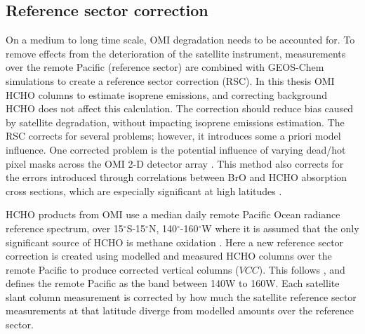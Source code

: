    
  \subsection{Reference sector correction}
    \label{Model:omiRecalc:RSC}
    
    On a medium to long time scale, OMI degradation needs to be accounted for.
    To remove effects from the deterioration of the satellite instrument, measurements over the remote Pacific (reference sector) are combined with GEOS-Chem simulations to create a reference sector correction (RSC).
    In this thesis OMI HCHO columns  to estimate isoprene emissions, and correcting background HCHO does not affect this calculation.
    The correction should reduce bias caused by satellite degradation, without impacting isoprene emissions estimation.
    The RSC corrects for several problems; however, it introduces some a priori model influence.
    One corrected problem is the potential influence of varying dead/hot pixel masks across the OMI 2-D detector array \parencite{DeSmedt2015}.
    This method also corrects for the errors introduced through correlations between BrO and HCHO absorption cross sections, which are especially significant at high latitudes \parencite{Abad2015}.
    
    HCHO products from OMI use a median daily remote Pacific Ocean radiance reference spectrum, over 15$^{\circ}$S-15$^{\circ}$N, 140$^{\circ}$-160$^{\circ}$W where it is assumed that the only significant source of HCHO is methane oxidation \parencite{DeSmedt2008,Barkley2013,Kurosu2014}.
    Here a new reference sector correction is created using modelled and measured HCHO columns over the remote Pacific to produce corrected vertical columns ($VCC$).
    This follows \textcite{Abad2016}, and defines the remote Pacific as the band between 140{\degr}W to 160{\degr}W.
    Each satellite slant column measurement is corrected by how much the satellite reference sector measurements at that latitude diverge from modelled amounts over the reference sector.
    
